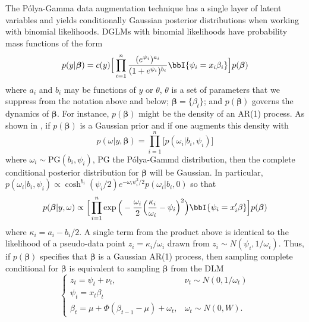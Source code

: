 \documentclass[11pt]{article}
\newcommand{\Polya}{P\'{o}lya}
\newcommand{\PG}{\text{PG}}
\newcommand{\bbeta}{\boldsymbol{\beta}}
\begin{document}
The \Polya-Gamma data augmentation technique \citep{polson-etal-2013} has a
single layer of latent variables and yields conditionally Gaussian posterior
distributions when working with binomial likelihoods.  DGLMs with binomial
likelihoods have probability mass functions of the form
\[
p(y | \bbeta) = c(y) \Big[ \prod_{i=1}^n
\frac{(e^{\psi_i})^{a_i}}{(1+e^{\psi_i})^{b_i}} \bbI \{\psi_i = x_i \beta_i\}
\Big] p(\bbeta)
\]
where $a_i$ and $b_i$ may be functions of $y$ or $\theta$, $\theta$ is a set of
parameters that we suppress from the notation above and below; $\bbeta =
\{\beta_t\}$; and $p(\bbeta)$ governs the dynamics of $\bbeta$.  For instance,
$p(\bbeta)$ might be the density of an AR(1) process.  As shown in
\cite{polson-etal-2012}, if $p(\bbeta)$ is a Gaussian prior and if one
augments this density with
\begin{equation}
\label{eqn:augmentation}
p(\omega | y, \bbeta) = \prod_{i=1}^n \Big[ p(\omega_i | b_i, \psi_i)
\Big]
\end{equation}
where $\omega_i \sim \PG(b_i, \psi_i)$, PG the \Polya-Gammd distribution, then
the complete conditional posterior distribution for $\bbeta$ will be Gaussian.
In particular, $p(\omega_i | b_i, \psi_i) \propto \cosh^{b_i}(\psi_i/2)
e^{-\omega_i \psi_i^2 / 2} p(\omega_i | b_i, 0)$ so that
\[
p(\bbeta | y, \omega) 
\propto 
\Big[ \prod_{i=1}^n \exp 
\Big(-\frac{\omega_i}{2} \Big(\frac{\kappa_i}{\omega_i} - \psi_i\Big)^2 \Big)
\bbI \{\psi_i = x_i' \beta\} \Big] p(\bbeta)
\]
where $\kappa_i = a_i - b_i / 2$.  A single term from the product above is
identical to the likelihood of a pseudo-data point $z_i = \kappa_i / \omega_i$
drawn from $z_i \sim N(\psi_i, 1/\omega_i)$.  Thus, if $p(\bbeta)$ specifies
that $\bbeta$ is a Gaussian AR(1) process, then sampling complete conditional
for $\bbeta$ is equivalent to sampling $\bbeta$ from the DLM
\[
\begin{cases}
z_t = \psi_t + \nu_t, & \nu_t \sim N(0, 1/\omega_t) \\
\psi_t = x_t \beta_t \\
\beta_t = \mu + \Phi (\beta_{t-1} - \mu) + \omega_t, & \omega_t \sim N(0, W).
\end{cases}
\]
\end{document}
